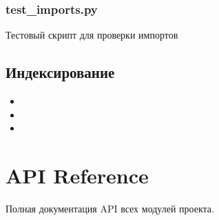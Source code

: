 \documentclass[a4paper,11pt,russian,openany,oneside]{sphinxmanual}
\begin{document}
\subsubsection{test\_imports.py}
\label{\detokenize{tests_module:module-tests_module.test_imports}}\label{\detokenize{tests_module:test-imports-py}}
\sphinxAtStartPar
Тестовый скрипт для проверки импортов


\subsection{Индексирование}
\label{\detokenize{tests_module:id42}}\begin{itemize}
\item {} 
\sphinxAtStartPar
{}

\item {} 
\sphinxAtStartPar
{}

\item {} 
\sphinxAtStartPar
{}

\end{itemize}

\sphinxstepscope


\section{API Reference}
\label{\detokenize{api:api-reference}}\label{\detokenize{api::doc}}
\sphinxAtStartPar
Полная документация API всех модулей проекта.
\end{document}
